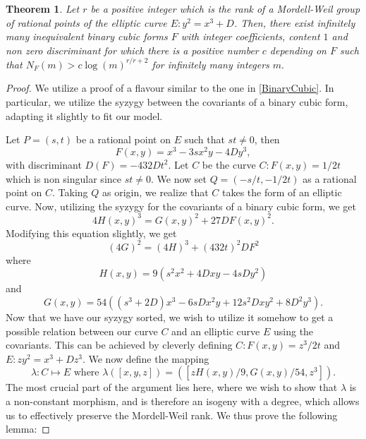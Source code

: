 \documentclass[10pt,a4paper]{amsart}
\newtheorem{thm}{Theorem}
\begin{document}
\begin{thm}
Let $r$ be a positive integer which is the rank of a Mordell-Weil group of rational points of the elliptic curve $E: y^2 = x^3 + D$. Then, there exist infinitely many inequivalent binary cubic forms $F$ with integer coefficients, content $1$ and non zero discriminant for which there is a positive number $c$ depending on $F$ such that $N_{F}(m) > c \log(m)^{r/r+2}$ for infinitely many integers $m.$
\end{thm} 

\begin{proof}
    

We utilize a proof of a flavour similar to the one in \ref{BinaryCubic}. In particular, we utilize the syzygy between the covariants of a binary cubic form, adapting it slightly to fit our model. 

Let $P= (s,t)$ be a rational point on $E$ such that $st \neq 0$, then $$F(x,y) = x^3 - 3sx^2y-4Dy^3,$$ with discriminant $D(F) = -432Dt^2$. Let $C$ be the curve $C: F(x,y) = 1/2t$ which is non singular since $st \neq 0.$ We now set $Q  = (-s/t, -1/2t)$ as a rational point on $C$. Taking $Q$ as origin, we realize that $C$ takes the form of an elliptic curve. Now, utilizing the syzygy for the covariants of a binary cubic form, we get $$4 H(x, y)^3=G(x, y)^2+27 D F(x, y)^2.$$ Modifying this equation slightly, we get $$(4G)^2 = (4H)^3 + (432t)^2 DF^2$$ where $$H(x, y) = 9(s^2 x^2 + 4D xy - 4s Dy^2)$$ and $$G(x, y) = 54 \left((s^3 + 2D)x^3 - 6sD x^2 y + 12s^2 D x y^2 + 8D^2 y^3 \right).$$
Now that we have our syzygy sorted, we wish to utilize it somehow to get a possible relation between our curve $C$ and an elliptic curve $E$ using the covariants. This can be achieved by cleverly defining $C: F(x,y) = z^3/2t$ and $E: zy^2 = x^3 + Dz^3$. We now define the mapping  $$ \lambda: C \mapsto E \textrm{ where } \lambda([x, y, z]) = \left(\left[ z H(x, y) / 9, G(x, y) / 54, z^3 \right]\right).$$ The most crucial part of the argument lies here, where we wish to show that $\lambda$ is a non-constant morphism, and is therefore an isogeny with a degree, which allows us to effectively preserve the Mordell-Weil rank. We thus prove the following lemma: 


\end{proof}
\end{document}
